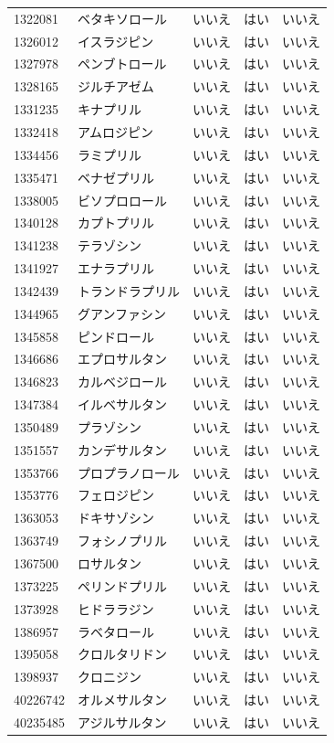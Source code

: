 \documentclass[
  11pt]{book}
\theoremstyle{definition}
\theoremstyle{definition}
\theoremstyle{definition}
\theoremstyle{definition}
\theoremstyle{remark}
\begin{document}
\begin{longtable}[]{@{}lllll@{}}
1322081 & ベタキソロール & いいえ & はい & いいえ \\
1326012 & イスラジピン & いいえ & はい & いいえ \\
1327978 & ペンブトロール & いいえ & はい & いいえ \\
1328165 & ジルチアゼム & いいえ & はい & いいえ \\
1331235 & キナプリル & いいえ & はい & いいえ \\
1332418 & アムロジピン & いいえ & はい & いいえ \\
1334456 & ラミプリル & いいえ & はい & いいえ \\
1335471 & ベナゼプリル & いいえ & はい & いいえ \\
1338005 & ビソプロロール & いいえ & はい & いいえ \\
1340128 & カプトプリル & いいえ & はい & いいえ \\
1341238 & テラゾシン & いいえ & はい & いいえ \\
1341927 & エナラプリル & いいえ & はい & いいえ \\
1342439 & トランドラプリル & いいえ & はい & いいえ \\
1344965 & グアンファシン & いいえ & はい & いいえ \\
1345858 & ピンドロール & いいえ & はい & いいえ \\
1346686 & エプロサルタン & いいえ & はい & いいえ \\
1346823 & カルベジロール & いいえ & はい & いいえ \\
1347384 & イルベサルタン & いいえ & はい & いいえ \\
1350489 & プラゾシン & いいえ & はい & いいえ \\
1351557 & カンデサルタン & いいえ & はい & いいえ \\
1353766 & プロプラノロール & いいえ & はい & いいえ \\
1353776 & フェロジピン & いいえ & はい & いいえ \\
1363053 & ドキサゾシン & いいえ & はい & いいえ \\
1363749 & フォシノプリル & いいえ & はい & いいえ \\
1367500 & ロサルタン & いいえ & はい & いいえ \\
1373225 & ペリンドプリル & いいえ & はい & いいえ \\
1373928 & ヒドララジン & いいえ & はい & いいえ \\
1386957 & ラベタロール & いいえ & はい & いいえ \\
1395058 & クロルタリドン & いいえ & はい & いいえ \\
1398937 & クロニジン & いいえ & はい & いいえ \\
40226742 & オルメサルタン & いいえ & はい & いいえ \\
40235485 & アジルサルタン & いいえ & はい & いいえ \\
\end{longtable}
\end{document}
